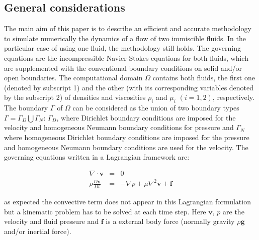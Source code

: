 \subsection{General considerations}\label{GeneralFor}

The main aim of this paper is to describe an efficient and accurate methodology to simulate numerically the dynamics of a flow of two immiscible fluids. In the particular case of using one fluid, the methodology still holds. The governing equations are the incompressible Navier-Stokes equations for both fluids, which are supplemented with the conventional boundary conditions on solid and/or open boundaries. The computational domain $\Omega$ contains both fluids, the first one (denoted by subscript 1) and the other (with its corresponding variables denoted by the subscript 2) of densities and viscosities $\rho_i$ and $\mu_i$ $(i=1,2)$, respectively. The boundary $\Gamma$ of $\Omega$ can be considered as the union of two boundary types $\Gamma=\Gamma_D\bigcup\Gamma_N$: $\Gamma_D$, where Dirichlet boundary conditions are imposed for the velocity and homogeneous Neumann boundary conditions for pressure and $\Gamma_N$ where homogeneous Dirichlet boundary conditions are imposed for the pressure and homogeneous Neumann boundary conditions are used for the velocity. The governing equations written in a Lagrangian framework are:

\begin{eqnarray}
  \nabla \cdot \mathbf{v} &=& 0 \label{eq:continuity} \\
  \rho\frac{D\mathbf{v}}{Dt} &=& -\nabla p + \mu \nabla^2 \mathbf{v} + \mathbf{f}\label{eq:momentum}
\end{eqnarray}

as expected the convective term does not appear in this Lagrangian formulation but a kinematic problem has to be solved at each time step. Here $\mathbf{v}$, $p$ are the velocity and fluid pressure and $\mathbf{f}$ is a external body force (normally gravity $\rho \mathbf{g}$ and/or inertial force).


